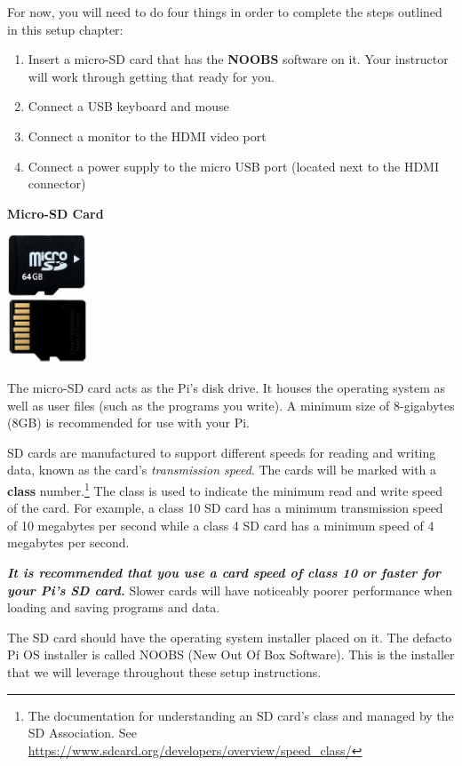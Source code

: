 For now, you will need to do four things in order to complete the steps outlined in this setup chapter:

\begin{enumerate}
	\item Insert a micro-SD card that has the \textbf{NOOBS} software on it. Your instructor will work through getting that ready for you.
	\item Connect a USB keyboard and mouse
	\item Connect a monitor to the HDMI video port
	\item Connect a power supply to the micro USB port (located next to the HDMI connector)
\end{enumerate}

\textbf{Micro-SD Card} \newline
\beforefig
\centerline{\includegraphics[height=1.50in]{pi_images/micro-sd-card.jpg}}
\afterfig


The micro-SD card acts as the Pi's disk drive. It houses the operating system as well as user files (such as the programs you write). A minimum size of 8-gigabytes (8GB) is recommended for use with your Pi.

SD cards are manufactured to support different speeds for reading and writing data, known as the card's \textit{transmission speed}. The cards will be marked with a \textbf{class} number.\footnote{The documentation for understanding an SD card's class and managed by the SD Association. See \url{https://www.sdcard.org/developers/overview/speed\_class/}} The class is used to indicate the minimum read and write speed of the card. For example, a class 10 SD card has a minimum transmission speed of 10 megabytes per second while a class 4 SD card has a minimum speed of 4 megabytes per second.

\textbf{\textit{It is recommended that you use a card speed of class 10 or faster for your Pi's SD card.}} Slower cards will have noticeably poorer performance when loading and saving programs and data.

The SD card should have the operating system installer placed on it. The defacto Pi OS installer is called NOOBS (New Out Of Box Software). This is the installer that we will leverage throughout these setup instructions.

